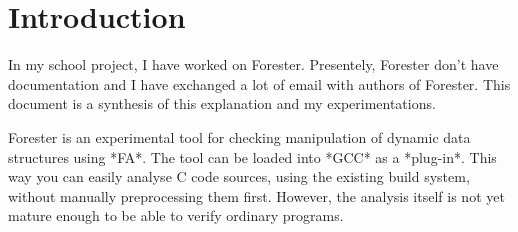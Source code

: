 \section {Introduction}

In my school project, I have worked on Forester. Presentely, Forester don't have documentation and I have exchanged a lot of email with authors of Forester. This document is a synthesis of this explanation and my experimentations.

Forester is an experimental tool for checking manipulation of dynamic data
structures using *\gls{FA}*. The tool can be loaded into *GCC* as a *plug-in*.  This
way you can easily analyse C code sources, using the existing build system,
without manually preprocessing them first. However, the analysis itself is not yet mature enough to be able to verify ordinary programs.